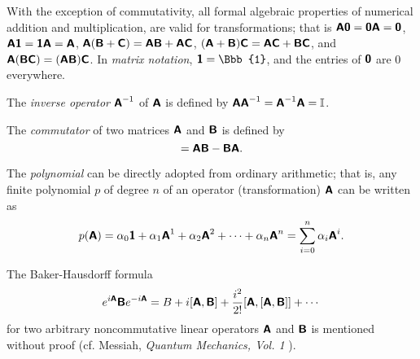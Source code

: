 With the exception of commutativity, all formal algebraic properties
of numerical addition and multiplication,
are valid for transformations; that is
$
\textsf{\textbf{A}}\textsf{\textbf{0}}=
\textsf{\textbf{0}}\textsf{\textbf{A}} =\textsf{\textbf{0}}
$,
$
\textsf{\textbf{A}}\textsf{\textbf{1}}=
\textsf{\textbf{1}}\textsf{\textbf{A}} =\textsf{\textbf{A}}
$,
$
\textsf{\textbf{A}} (\textsf{\textbf{B}}+\textsf{\textbf{C}})=
\textsf{\textbf{A}} \textsf{\textbf{B}}
+
\textsf{\textbf{A}} \textsf{\textbf{C}}
$,
$
(\textsf{\textbf{A}}+ \textsf{\textbf{B}})\textsf{\textbf{C}}=
\textsf{\textbf{A}} \textsf{\textbf{C}}
+
\textsf{\textbf{B}} \textsf{\textbf{C}}
$,  and
$
\textsf{\textbf{A}} (\textsf{\textbf{B}}\textsf{\textbf{C}})=
(\textsf{\textbf{A}} \textsf{\textbf{B}})
 \textsf{\textbf{C}}
$.
In {\em matrix notation},  $\textsf{\textbf{1}} ={\Bbb{1}}$, and the entries of $\textsf{\textbf{0}}$
are $0$ everywhere.

The {\em inverse operator}
$\textsf{\textbf{A}}^{-1}$
of $\textsf{\textbf{A}}$
is defined by
$\textsf{\textbf{A}}\textsf{\textbf{A}}^{-1}=\textsf{\textbf{A}}^{-1}\textsf{\textbf{A}}=
{\Bbb I}$.


The {\em commutator}
of two matrices $\textsf{\textbf{A}}$  and $\textsf{\textbf{B}}$ is defined by
\begin{equation}
[\textsf{\textbf{A}}, \textsf{\textbf{B}} ]
=
\textsf{\textbf{A}} \textsf{\textbf{B}}
-
 \textsf{\textbf{B}}      \textsf{\textbf{A}}.
\end{equation}

The {\em polynomial}
can be directly adopted from ordinary arithmetic; that is,
any finite polynomial $p$ of degree $n$
of an operator (transformation) $\textsf{\textbf{A}}$ can be written as
\begin{equation}
p(\textsf{\textbf{A}})= \alpha_0   \textsf{\textbf{1}}
+ \alpha_1   \textsf{\textbf{A}}^1
+ \alpha_2   \textsf{\textbf{A}}^2+
\cdots
+
\alpha_n   \textsf{\textbf{A}}^n
=\sum_{i=0}^n \alpha_i \textsf{\textbf{A}}^i
.
\end{equation}

The Baker-Hausdorff formula
 \begin{equation}
 e^{i\textsf{\textbf{A}}}\textsf{\textbf{B}}e^{-i\textsf{\textbf{A}}}=
B+i[\textsf{\textbf{A}},\textsf{\textbf{B}}]+
{i^2\over 2!}[\textsf{\textbf{A}},[\textsf{\textbf{A}},\textsf{\textbf{B}}]]+\cdots
 \end{equation}
for two arbitrary noncommutative linear operators $\textsf{\textbf{A}}$ and
$\textsf{\textbf{B}}$ is mentioned without proof
(cf.  Messiah, {\sl Quantum Mechanics, Vol. 1} \cite{messiah-61}).

